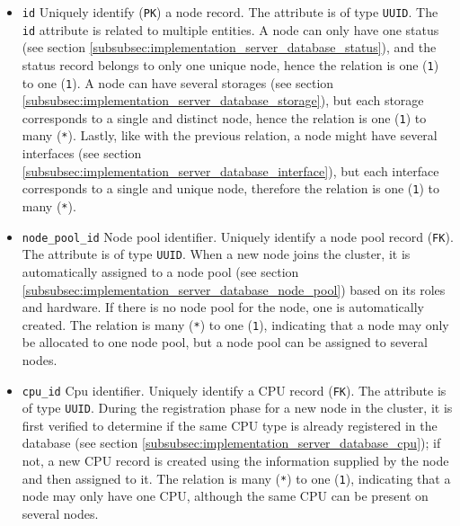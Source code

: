 \begin{itemize}
  \item \texttt{id}
    \newline
    Uniquely identify (\texttt{PK}) a node record.
    \newline
    The attribute is of type \texttt{UUID}.
    \newline
    The \texttt{id} attribute is related to multiple entities. A node can only
    have one status (see section \ref{subsubsec:implementation_server_database_status}),
    and the status record belongs to only one unique node, hence the relation is
    one (\texttt{1}) to one (\texttt{1}). A node can have several storages (see
    section \ref{subsubsec:implementation_server_database_storage}), but each
    storage corresponds to a single and distinct node, hence the relation is one
    (\texttt{1}) to many (\texttt{*}). Lastly, like with the previous relation,
    a node might have several interfaces (see section \ref{subsubsec:implementation_server_database_interface}),
    but each interface corresponds to a single and unique node, therefore the
    relation is one (\texttt{1}) to many (\texttt{*}).

  \item \texttt{node\_pool\_id}
    \newline
    Node pool identifier.
    \newline
    Uniquely identify a node pool record (\texttt{FK}).
    \newline
    The attribute is of type \texttt{UUID}.
    \newline
    When a new node joins the cluster, it is automatically assigned to a node
    pool (see section \ref{subsubsec:implementation_server_database_node_pool})
    based on its roles and hardware. If there is no node pool for the node, one
    is automatically created. The relation is many (\texttt{*}) to one (\texttt{1}),
    indicating that a node may only be allocated to one node pool, but a node pool
    can be assigned to several nodes.

  \item \texttt{cpu\_id}
    \newline
    Cpu identifier.
    \newline
    Uniquely identify a CPU record (\texttt{FK}).
    \newline
    The attribute is of type \texttt{UUID}.
    \newline
    During the registration phase for a new node in the cluster, it is first
    verified to determine if the same CPU type is already registered in the
    database (see section \ref{subsubsec:implementation_server_database_cpu}); if
    not, a new CPU record is created using the information supplied by the node
    and then assigned to it.
    \newline
    The relation is many (\texttt{*}) to one (\texttt{1}), indicating that a
    node may only have one CPU, although the same CPU can be present on several nodes.


\end{itemize}
